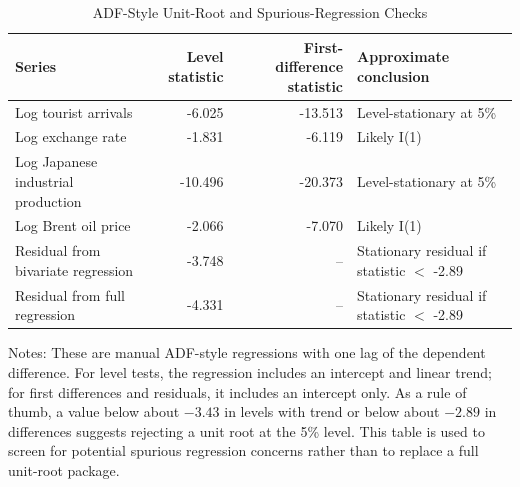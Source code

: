 \begin{table}[H]
\centering
\caption{ADF-Style Unit-Root and Spurious-Regression Checks}
\label{tab:adf}
\begin{tabular}{lrrl}
\toprule
Series & Level statistic & First-difference statistic & Approximate conclusion \\
\midrule
Log tourist arrivals & -6.025 & -13.513 & Level-stationary at 5\% \\
Log exchange rate & -1.831 & -6.119 & Likely I(1) \\
Log Japanese industrial production & -10.496 & -20.373 & Level-stationary at 5\% \\
Log Brent oil price & -2.066 & -7.070 & Likely I(1) \\
\midrule
Residual from bivariate regression & -3.748 & -- & Stationary residual if statistic $<$ -2.89 \\
Residual from full regression & -4.331 & -- & Stationary residual if statistic $<$ -2.89 \\
\bottomrule
\end{tabular}
\begin{minipage}{0.95\textwidth}
\vspace{0.4em}\footnotesize Notes: These are manual ADF-style regressions with one lag of the dependent difference. For level tests, the regression includes an intercept and linear trend; for first differences and residuals, it includes an intercept only. As a rule of thumb, a value below about $-3.43$ in levels with trend or below about $-2.89$ in differences suggests rejecting a unit root at the 5\% level. This table is used to screen for potential spurious regression concerns rather than to replace a full unit-root package.
\end{minipage}
\end{table}
